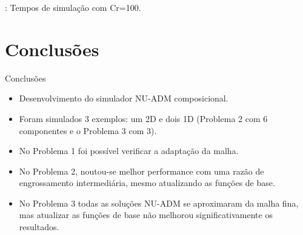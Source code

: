 \documentclass[professionalfont]{beamer}
\begin{document}
\begin{frame}{\FrameProblemName: {\small Tempos de simulação com Cr=100.}}
\begin{figure}[!h]
        \label{fig:fig9_pr2-cr100}
    \end{figure}
\end{frame}



\section{Conclusões}
\begin{frame}{Conclusões}

    \begin{itemize}
        \item Desenvolvimento do simulador NU-ADM composicional.
        \item Foram simulados 3 exemplos: um 2D e dois 1D (Problema 2 com 6 componentes e o Problema 3 com 3).
        \item No Problema 1 foi possível verificar a adaptação da malha.
        \item No Problema 2, noutou-se melhor performance com uma razão de engrossamento intermediária, mesmo atualizando as funções de base.
        \item No Problema 3 todas as soluções NU-ADM se aproximaram da malha fina, mas atualizar as funções de base não melhorou significativamente os resultados.
    \end{itemize}


    
\end{frame}
\end{document}
